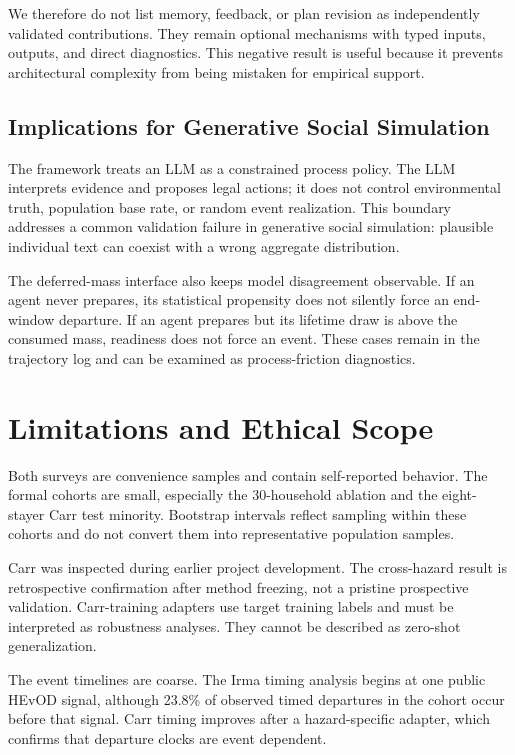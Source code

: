 \documentclass[journal]{IEEEtran}
\begin{document}
We therefore do not list memory, feedback, or plan revision as independently
validated contributions. They remain optional mechanisms with typed inputs,
outputs, and direct diagnostics. This negative result is useful because it
prevents architectural complexity from being mistaken for empirical support.

\subsection{Implications for Generative Social Simulation}
The framework treats an LLM as a constrained process policy. The LLM interprets
evidence and proposes legal actions; it does not control environmental truth,
population base rate, or random event realization. This boundary addresses a
common validation failure in generative social simulation: plausible
individual text can coexist with a wrong aggregate distribution.

The deferred-mass interface also keeps model disagreement observable. If an
agent never prepares, its statistical propensity does not silently force an
end-window departure. If an agent prepares but its lifetime draw is above the
consumed mass, readiness does not force an event. These cases remain in the
trajectory log and can be examined as process-friction diagnostics.

\section{Limitations and Ethical Scope}
Both surveys are convenience samples and contain self-reported behavior. The
formal cohorts are small, especially the 30-household ablation and the
eight-stayer Carr test minority. Bootstrap intervals reflect sampling within
these cohorts and do not convert them into representative population samples.

Carr was inspected during earlier project development. The cross-hazard result
is retrospective confirmation after method freezing, not a pristine
prospective validation. Carr-training adapters use target training labels and
must be interpreted as robustness analyses. They cannot be described as
zero-shot generalization.

The event timelines are coarse. The Irma timing analysis begins at one public
HEvOD signal, although 23.8\% of observed timed departures in the cohort occur
before that signal. Carr timing improves after a hazard-specific adapter,
which confirms that departure clocks are event dependent.
\end{document}
